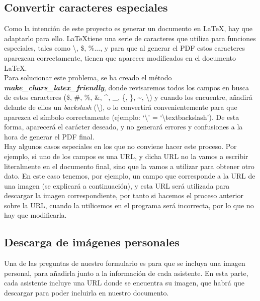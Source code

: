 \documentclass[a4paper, 12pt]{book}
\begin{document}
\subsection{Convertir caracteres especiales}
\label{subsec:especialCars}
Como la intención de este proyecto es generar un documento en \LaTeX, hay que adaptarlo para ello. \LaTeX tiene una serie de caracteres que utiliza para funciones especiales, tales como \textbackslash, \$, \%..., y para que al generar el PDF estos caracteres aparezcan correctamente, tienen que aparecer modificados en el documento \LaTeX.\\

Para solucionar este problema, se ha creado el método \textbf{\textit{make\_chars\_latex\_friendly}}, donde revisaremos todos los campos en busca de estos caracteres (\$, \#, \%, \&, \textasciicircum, \_, \{, \}, \textasciitilde, \textbackslash) y cuando los encuentre, añadirá delante de ellos un \textit{backslash} (\textbackslash), o lo convertirá convenientemente para que aparezca el símbolo correctamente (ejemplo: `\textbackslash' = `\textbackslash textbackslash'). De esta forma, aparecerá el carácter deseado, y no generará errores y confusiones a la hora de generar el PDF final.\\

Hay algunos casos especiales en los que no conviene hacer este proceso. Por ejemplo, si uno de los campos es una URL, y dicha URL no la vamos a escribir literalmente en el documento final, sino que la vamos a utilizar para obtener otro dato. En este caso tenemos, por ejemplo, un campo que corresponde a la URL de una imagen (se explicará a continuación), y esta URL será utilizada para descargar la imagen correspondiente, por tanto si hacemos el proceso anterior sobre la URL, cuando la utilicemos en el programa será incorrecta, por lo que no hay que modificarla.


\subsection{Descarga de imágenes personales}
\label{subsec:imagenes}
Una de las preguntas de nuestro formulario es para que se incluya una imagen personal, para añadirla junto a la información de cada asistente. En esta parte, cada asistente incluye una URL donde se encuentra su imagen, que habrá que descargar para poder incluirla en nuestro documento.\\
\end{document}
